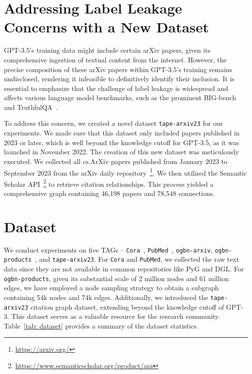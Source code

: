 \documentclass{article}
\begin{document}
\section{Addressing Label Leakage Concerns with a New Dataset}\label{app: arxiv2023}

GPT-3.5's training data might include certain arXiv papers, given its comprehensive ingestion of textual content from the internet. However, the precise composition of these arXiv papers within GPT-3.5's training remains undisclosed, rendering it infeasible to definitively identify their inclusion. It is essential to emphasize that the challenge of label leakage is widespread and affects various language model benchmarks, such as the prominent BIG-bench~\citep{srivastava2022beyond_bigbench} and TruthfulQA~\citep{lin2021truthfulqa}.

To address this concern, we created a novel dataset \texttt{tape-arxiv23} for our experiments. We made sure that this dataset only included papers published in 2023 or later, which is well beyond the knowledge cutoff for GPT-3.5, as it was launched in November 2022. The creation of this new dataset was meticulously executed. We collected all cs.ArXiv papers published from January 2023 to September 2023 from the arXiv daily repository~\footnote{\url{https://arxiv.org/}}. We then utilized the Semantic Scholar API~\footnote{\url{https://www.semanticscholar.org/product/api}} to retrieve citation relationships. This process yielded a comprehensive graph containing 46,198 papers and 78,548 connections.



\section{Dataset}\label{app sec: dataset}
We conduct experiments on five TAGs -- \texttt{Cora}~\citep{mccallum2000automating_cora}, \texttt{PubMed}~\citep{sen2008collective_pubmed}, \texttt{ogbn-arxiv}, \texttt{ogbn-products}~\citep{hu2020open}, and \texttt{tape-arxiv23}.  
For \texttt{Cora} and \texttt{PubMed}, we collected the raw text data since they are not available in common repositories like PyG and DGL. For \texttt{ogbn-products}, given its substantial scale of 2 million nodes and 61 million edges, we have employed a node sampling strategy to obtain a subgraph containing 54k nodes and 74k edges. Additionally, we introduced the \texttt{tape-arxiv23} citation graph dataset, extending beyond the knowledge cutoff of GPT-3. This dataset serves as a valuable resource for the research community. Table~\ref{tab: dataset} provides a summary of the dataset statistics.
\end{document}
